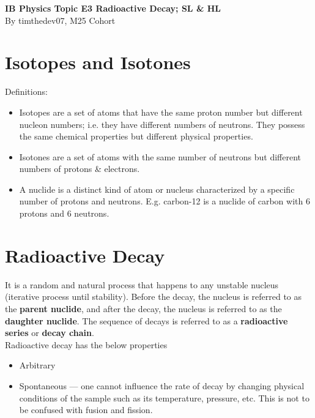 \documentclass[a4paper,12pt]{article}
\let\oldsection\section
\renewcommand\section{\clearpage\oldsection}
\newcommand{\lb}{\\[8pt]}
\begin{document}
\pagestyle{fancy}


\begin{titlepage}
  \begin{center}

    \vspace*{8cm}
    \textbf{\Large {IB Physics Topic E3 Radioactive Decay; SL \& HL}} \\
    \vspace*{1cm}
    \large{By timthedev07, M25 Cohort}

  \end{center}
\end{titlepage}

\pagebreak
\tableofcontents
\pagebreak

\clearpage
\setcounter{page}{1}

\section{Isotopes and Isotones}

Definitions:

\begin{itemize}
  \item Isotopes are a set of atoms that have the same proton number but different nucleon numbers; i.e. they have different numbers of neutrons. They possess the same chemical properties but different physical properties.
  \item Isotones are a set of atoms with the same number of neutrons but different numbers of protons \& electrons.
  \item A nuclide is a distinct kind of atom or nucleus characterized by a specific number of protons and neutrons. E.g. carbon-12 is a nuclide of carbon with 6 protons and 6 neutrons.
\end{itemize}

\section{Radioactive Decay}

It is a random and natural process that happens to any unstable nucleus (iterative process until stability). Before the decay, the nucleus is referred to as the \textbf{parent nuclide}, and after the decay, the nucleus is referred to as the \textbf{daughter nuclide}. The sequence of decays is referred to as a \textbf{radioactive series} or \textbf{decay chain}.\lb
Radioactive decay has the below properties
\begin{itemize}
  \item Arbitrary
  \item Spontaneous --- one cannot influence the rate of decay by changing physical conditions of the sample such as its temperature, pressure, etc. This is not to be confused with fusion and fission.
\end{itemize}
\end{document}
